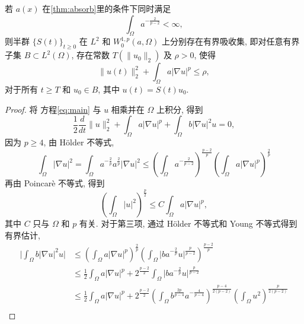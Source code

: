 \documentclass[oneside,longtitle]{LZUthesis}
\numberwithin{equation}{chapter}
\newcommand*\abs[1]{\lvert#1\rvert}
\newcommand*\norm[1]{\lVert#1\rVert}
\newcommand*\Brace[1]{\lbrace#1\rbrace}
\begin{document}
\begin{theorem}\label{thm:real_absorb}
	若 $a(x)$ 在\cref{thm:absorb}里的条件下同时满足
	\begin{equation}\label{eq:a_condition}
		\int_{\Omega}a^{-\frac{2}{p-2}} < \infty,
	\end{equation}
	则半群 $\Brace{S(t)}_{t \geq 0} $ 在
	$L^2$ 和 $W_0^{1,p}(a,\Omega)$ 上分别存在有界吸收集, 即对任意有界子集
	$B \subset L^2(\Omega)$, 存在常数 $T(\norm{u_0}_2)$ 及 $\rho > 0$, 使得
	\begin{equation*}
		\norm{u(t)}_2^2 + \int_{\Omega}a\abs{\nabla u}^p \leq \rho,
	\end{equation*}
	对于所有 $t \geq T$ 和 $u_0 \in B$, 其中 $u(t) = S(t)u_0$.
\end{theorem}
\begin{proof}
	将 方程\eqref{eq:main} 与 $u$ 相乘并在 $\Omega$ 上积分,
	得到
	\begin{equation}\label{eq:operate_u}
		\frac{1}{2}\frac{d}{dt}\norm{u}_2^2
		+ \int_\Omega a\abs{\nabla u}^p
		+ \int_\Omega b\abs{\nabla u}^2u = 0,
	\end{equation}
	因为 $p \geq 4$, 由 H\"older 不等式,
	\begin{equation}\label{eq:DL2_bd_W1pa}
		\int_{\Omega}\abs{\nabla u}^2
		= \int_{\Omega}a^{-\frac{2}{p}}a^{\frac{2}{p}}\abs{\nabla u}^2
		\leq \left(\int_{\Omega}a^{-\frac{2}{p-2}}\right)^{\frac{p-2}{p}}
		\left(\int_{\Omega}a\abs{\nabla u}^p\right)^{\frac{2}{p}}
	\end{equation}
	再由 Poincar\`e 不等式, 得到
	\begin{equation*}
		\left(\int_{\Omega}\abs{u}^2\right)^{\frac{p}{2}}
		\leq C\int_{\Omega}a\abs{\nabla u}^p,
	\end{equation*}
	其中 $C$ 只与 $\Omega$ 和 $p$ 有关. 对于第三项, 通过
	H\"older 不等式和 Young 不等式得到有界估计,
	\begin{equation}\label{eq:absorb_damping_u}
		\begin{split}
			\abs{\int_{\Omega}b\abs{\nabla u}^2 u}
			&\leq \left(\int_{\Omega}a\abs{\nabla u}^p\right)^{\frac{2}{p}}
			\left(\int_{\Omega}\abs{b a^{-\frac{2}{p}} u}^{\frac{p}{p-2}}\right)^{\frac{p-2}{p}}\\
			&\leq \frac{1}{2}\int_{\Omega}a\abs{\nabla u}^p
			+ 2^{\frac{p-2}{2}}\int_{\Omega}\abs{b a^{-\frac{2}{p}} u}^{\frac{p}{p-2}}\\
			&\leq \frac{1}{2}\int_{\Omega}a\abs{\nabla u}^p
			+ 2^{\frac{p-2}{2}}\left(\int_{\Omega}b^{\frac{2p}{p-4}}a^{-\frac{4}{p-4}}\right)^{\frac{p-4}{2(p-2)}}
			\left(\int_{\Omega}u^2\right)^{\frac{p}{2(p-2)}}\\

\end{split}
\end{equation}
\end{proof}
\end{document}
